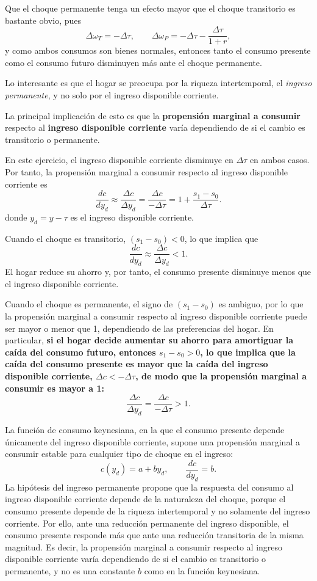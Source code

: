 \documentclass[11pt]{article}
\begin{document}
Que el choque permanente tenga un efecto mayor que el choque transitorio es bastante obvio, pues
\[
  \Delta\omega_T=-\Delta\tau,
  \qquad
  \Delta\omega_P
  =
  -\Delta\tau-\frac{\Delta\tau}{1+r},
\]
y como ambos consumos son bienes normales, entonces tanto el consumo presente como el consumo futuro disminuyen más ante el choque permanente.


Lo interesante es que el hogar se preocupa por la riqueza intertemporal, el \textit{ingreso permanente}, y no solo por el ingreso disponible corriente.

La principal implicación de esto es que la \textbf{propensión marginal a consumir} respecto al \textbf{ingreso disponible corriente} varía dependiendo de si el cambio es transitorio o permanente.

En este ejercicio, el ingreso disponible corriente disminuye en \(\Delta\tau\) en ambos casos. Por tanto, la propensión marginal a consumir respecto al ingreso disponible corriente es
$$
\frac{d c}{d y_d} \approx
\frac{\Delta c}{\Delta y_d} = \frac{\Delta c}{-\Delta\tau} = 1 + \frac{s_1 - s_0}{\Delta \tau}.
$$
donde $y_d = y - \tau$ es el ingreso disponible corriente.

Cuando el choque es transitorio, $(s_1-s_0) < 0$, lo que implica que
$$
\frac{d c}{d y_d} \approx
\frac{\Delta c}{\Delta y_d} < 1.
$$
El hogar reduce su ahorro y, por tanto, el consumo presente disminuye menos que el ingreso disponible corriente.

Cuando el choque es permanente, el signo de $(s_1-s_0)$ es ambiguo, por lo que la propensión marginal a consumir respecto al ingreso disponible corriente puede ser mayor o menor que 1, dependiendo de las preferencias del hogar. En particular, \textbf{si el hogar decide aumentar su ahorro para amortiguar la caída del consumo futuro, entonces \(s_1-s_0>0\), lo que implica que la caída del consumo presente es mayor que la caída del ingreso
disponible corriente, $\Delta c < -\Delta \tau$, de modo que la propensión marginal a consumir es mayor a 1:
\[
  \frac{\Delta c}{\Delta y_d}
  =
  \frac{\Delta c}{-\Delta\tau}
  >1.
\]}

La función de consumo keynesiana, en la que el consumo presente depende únicamente del ingreso disponible corriente, supone una propensión marginal a consumir estable para cualquier tipo de choque en el ingreso:
\[
  c(y_d)= a + b y_d,
  \qquad
  \frac{dc}{d y_d}= b.
\]
La hipótesis del ingreso permanente propone que la respuesta del consumo al ingreso disponible corriente depende de la naturaleza del choque, porque el consumo presente depende de la riqueza intertemporal y no solamente del ingreso corriente. Por ello, ante una reducción permanente del ingreso disponible, el consumo presente responde más que ante una reducción transitoria de la misma magnitud. Es decir, la propensión marginal a consumir respecto al ingreso disponible corriente varía dependiendo de si el cambio es transitorio o permanente, y no es una constante \(b\) como en la función keynesiana.
\end{document}
